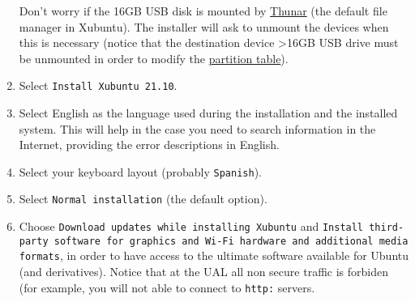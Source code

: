 \begin{enumerate}
  Don't worry if the 16GB USB disk is mounted
  by \href{https://gitlab.xfce.org/xfce/thunar}{Thunar} (the default
  file manager in Xubuntu). The installer will ask to unmount the
  devices when this is necessary (notice that the destination device
  >16GB USB drive must be unmounted in order to modify
  the \href{https://en.wikipedia.org/wiki/Disk_partitioning}{partition
  table}).
  
\item Select \texttt{Install Xubuntu 21.10}.
  
\item Select English as the language used during the installation and the
  installed system. This will help in the case you need to search
  information in the Internet, providing the error descriptions in
  English.
  
\item Select your keyboard layout (probably \texttt{Spanish}).

%
%

\item Select \verb|Normal installation| (the default option).
  
\item Choose \texttt{Download updates while installing Xubuntu} and
  \texttt{Install third-party software for graphics and Wi-Fi hardware
    and additional media formats}, in order to have access to the
  ultimate software available for Ubuntu (and derivatives). Notice
  that at the UAL all non secure traffic is forbiden (for example, you
  will not able to connect to \verb|http:| servers.


\end{enumerate}
